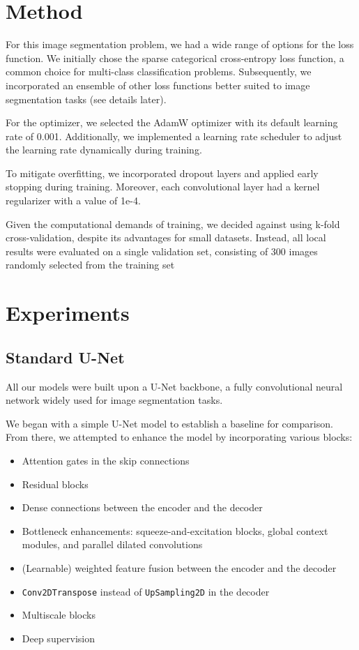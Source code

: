 \documentclass[11pt]{article}
\begin{document}
\begin{multicols}{2}
    \section{Method}

    For this image segmentation problem, we had a wide range of options for the loss function. We initially chose the sparse categorical cross-entropy loss function, a common choice for multi-class classification problems. Subsequently, we incorporated an ensemble of other loss functions better suited to image segmentation tasks (see details later).

    For the optimizer, we selected the AdamW \cite{Adam} optimizer with its default learning rate of 0.001. Additionally, we implemented a learning rate scheduler to adjust the learning rate dynamically during training.

    To mitigate overfitting, we incorporated dropout layers and applied early stopping during training. Moreover, each convolutional layer had a kernel regularizer with a value of 1e-4.

    Given the computational demands of training, we decided against using k-fold cross-validation, despite its advantages for small datasets. Instead, all local results were evaluated on a single validation set, consisting of 300 images randomly selected from the training set

    \section{Experiments}

    \subsection{Standard U-Net}

    All our models were built upon a U-Net backbone, a fully convolutional neural network widely used for image segmentation tasks.

    We began with a simple U-Net model to establish a baseline for comparison. From there, we attempted to enhance the model by incorporating various blocks:

    \begin{itemize}
        \item Attention gates in the skip connections
        \item Residual blocks
        \item Dense connections between the encoder and the decoder
        \item Bottleneck enhancements: squeeze-and-excitation blocks, global context modules, and parallel dilated convolutions
        \item (Learnable) weighted feature fusion between the encoder and the decoder
        \item \texttt{Conv2DTranspose} instead of \texttt{UpSampling2D} in the decoder
        \item Multiscale blocks
        \item Deep supervision
    \end{itemize}


\end{multicols}
\end{document}
